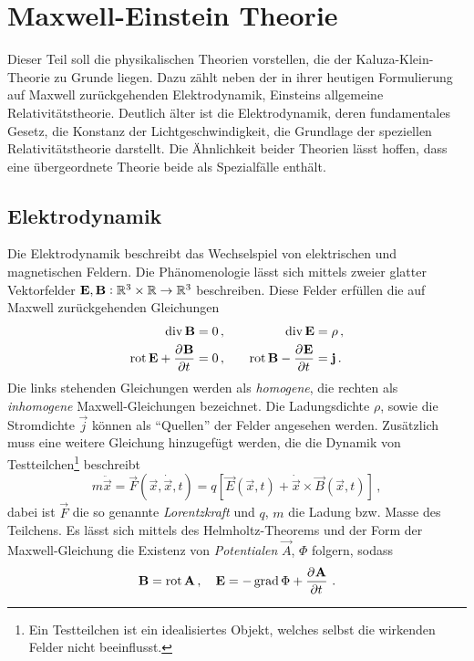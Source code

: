 \chapter{Maxwell-Einstein Theorie \label{chap:EMW}}
Dieser Teil soll die physikalischen Theorien vorstellen, die der
Kaluza-Klein-Theorie zu Grunde liegen. Dazu zählt neben der
in ihrer heutigen Formulierung auf Maxwell zurückgehenden
Elektrodynamik, Einsteins allgemeine Relativitätstheorie.
Deutlich älter ist die Elektrodynamik, deren fundamentales Gesetz, die Konstanz
der Lichtgeschwindigkeit, die Grundlage der speziellen Relativitätstheorie
darstellt.
Die Ähnlichkeit beider Theorien lässt hoffen, dass eine
übergeordnete Theorie beide als Spezialfälle enthält.
\section{Elektrodynamik}
Die Elektrodynamik beschreibt das Wechselspiel von elektrischen und
magnetischen Feldern. Die Phänomenologie lässt sich mittels zweier glatter Vektorfelder
${\mathbf{E},\mathbf{B}:\mathbb{R}^3\times\mathbb{R}\to \mathbb{R}^3}$ beschreiben.
Diese Felder erfüllen die auf Maxwell zurückgehenden Gleichungen
\begin{equation}
\begin{alignedat}{2}
\Div\vec{B} &= 0    \,,  & \qquad \Div\vec{E} &= \rho
\,,\\
\Rot\vec{E}+\dpd{\vec{B}}{t}&=0\,,& \qquad\Rot\vec{B}-\dpd{\vec{E}}{t}&
=\vec{j}\,.
\end{alignedat}
\end{equation}
Die links stehenden Gleichungen werden als \emph{homogene}, die rechten als
\emph{inhomogene} Maxwell-Gleichungen bezeichnet. Die Ladungsdichte $\rho$,
sowie die Stromdichte $\vec{j}$ können als "`Quellen"' der Felder angesehen
werden. Zusätzlich muss eine weitere Gleichung hinzugefügt werden, die die
Dynamik von Testteilchen\footnote{Ein Testteilchen ist ein idealisiertes Objekt, welches selbst die wirkenden Felder nicht beeinflusst.} beschreibt
\begin{equation}
m\ddot{\vec{x}}=\vec{F}(\vec{x},\dot{\vec{x}},t)
=q\left[\vec{E}(\vec{x},t)+\dot{\vec{x}}\times\vec{B}(\vec{x},t)\right]\,,
\end{equation}
dabei ist $\vec{F}$ die so genannte \emph{Lorentzkraft} und $q$, $m$ die
Ladung bzw. Masse des Teilchens.
Es lässt sich mittels des Helmholtz-Theorems und der Form der Maxwell-Gleichung
die Existenz von \emph{Potentialen} $\vec{A}$, $\Phi$ folgern, sodass
\begin{equation}
\vec{B}=\Rot \vec{A}\,,\quad
\vec{E}=-\Grad\Phi+\dpd{\vec{A}}{t}\,.\label{eq:Vecpot}
\end{equation}
